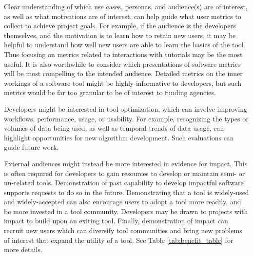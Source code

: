 \documentclass{article}
\begin{document}
Clear understanding of which use cases, personas, and audience(s) are of interest, as well as what motivations are of interest, can help guide what user metrics to collect to achieve project goals. For example, if the audience is the developers themselves, and the motivation is to learn how to retain new users, it may be helpful to understand how well new users are able to learn the basics of the tool. Thus focusing on metrics related to interactions with tutorials may be the most useful. It is also worthwhile to consider which presentations of software metrics will be most compelling to the intended audience. Detailed metrics on the inner workings of a software tool might be highly-informative to developers, but such metrics would be far too granular to be of interest to funding agencies.

Developers might be interested in tool optimization, which can involve improving workflows, performance, usage, or usability. For example, recognizing the types or volumes of data being used, as well as temporal trends of data usage, can highlight opportunities for new algorithm development. Such evaluations can guide future work.

External audiences might instead be more interested in evidence for impact. This is often required for developers to gain resources to develop or maintain semi- or un-related tools. Demonstration of past capability to develop impactful software supports requests to do so in the future. Demonstrating that a tool is widely-used and widely-accepted can also encourage users to adopt a tool more readily, and be more invested in a tool community. Developers may be drawn to projects with impact to build upon an exiting tool. Finally, demonstration of impact can recruit new users which can diversify tool communities and bring new problems of interest that expand the utility of a tool. See Table \ref{tab:benefit_table} for more details.
 
\end{document}
